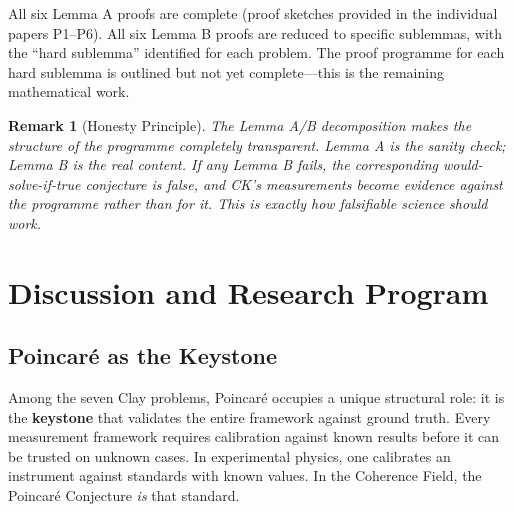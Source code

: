 \documentclass[11pt]{article}
\newtheorem{remark}[theorem]{Remark}
\begin{document}
\noindent All six Lemma A proofs are complete (proof sketches provided in the individual papers P1--P6). All six Lemma B proofs are reduced to specific sublemmas, with the ``hard sublemma'' identified for each problem. The proof programme for each hard sublemma is outlined but not yet complete---this is the remaining mathematical work.

\begin{remark}[Honesty Principle]
The Lemma A/B decomposition makes the structure of the programme completely transparent. Lemma A is the sanity check; Lemma B is the real content. If any Lemma B fails, the corresponding would-solve-if-true conjecture is false, and CK's measurements become evidence \emph{against} the programme rather than for it. This is exactly how falsifiable science should work.
\end{remark}

\section{Discussion and Research Program}
\label{sec:discussion}

\subsection{Poincar\'e as the Keystone}
\label{subsec:keystone}

Among the seven Clay problems, Poincar\'e occupies a unique structural
role: it is the \textbf{keystone} that validates the entire framework
against ground truth.  Every measurement framework requires calibration
against known results before it can be trusted on unknown cases.  In
experimental physics, one calibrates an instrument against standards
with known values.  In the Coherence Field, the Poincar\'e Conjecture
\emph{is} that standard.
\end{document}
